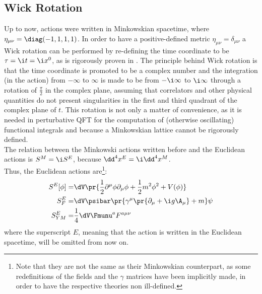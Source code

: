 \begin{comment}
\\Everything that has been said for $\SUN$ can be also extended to $\mathit{SO}(N)$ by replacing \emph{unitary} with \emph{orthogonal} and \emph{traceless} with \emph{antisymmetric}. In fact, this discussion can be made for every compact\footnote{Compactness, \ie $\Tr{T^aT^b}$ positive defined, is required in order to have a bounded from below Hamiltonian.} group, such as the symplectic group $\mathit{Sp}(2N)$ and the five exceptional Lie groups $\mathit{G}(2)$, $\spF$, $\mathit{E}(6)$, $\mathit{E}(7)$ and $\mathit{E}(8)$.
\end{comment}

\subsection{Wick Rotation}
Up to now, actions were written in Minkowskian spacetime, where $\eta_{\mu\nu} = \diag(-1,1,1,1)$. In order to have a positive-defined metric $\eta_{\mu\nu} = \delta_{\mu\nu}$ a Wick rotation can be performed by re-defining the time coordinate to be $\tau = \i t = \i x^0$, as is rigorously proven in \cite{SCHLINGEMANN_1999}.
The principle behind Wick rotation is that the time coordinate is promoted to be a complex number and the integration (in the action) from $-\infty$ to $\infty$ is made to be from $-\i\infty$ to $\i\infty$ through a rotation of $\frac\pi2$ in the complex plane, assuming that correlators and other physical quantities do not present singularities in the first and third quadrant of the complex plane of $t$.
This rotation is not only a matter of convenience, as it is needed in perturbative QFT for the computation of (otherwise oscillating) functional integrals and because a Minkowskian lattice cannot be rigorously defined.\\
The relation between the Minkowski actions written before and the Euclidean actions is $S^M = \i S^E$, because $\dd^4x^E = \i \dd^4x^M$.\\
Thus, the Euclidean actions are\footnote{Note that they are not the same as their Minkowskian counterpart, as some redefinitions of the fields and the $\gamma$ matrices have been implicitly made, in order to have the respective theories non ill-defined.}:
\begin{align}
    S^E[\phi] =& \dV \pr{\frac12\partial^\mu\phi\partial_\mu\phi+\frac12m^2\phi^2+V(\phi)} \label{1:ScalarActionEuclidean}\\
    S^E_F =& \dV\psibar\pr{\gamma^\mu\pr{\partial_\mu+\i g \A_\mu} + m}\psi \label{1:FerionActionEuclidean}\\
    S^E_{YM} =& \frac14 \dV \Fmunu^a F^{a\mu\nu} \label{1:YMActionEuclidean}
\end{align}
where the superscript $E$, meaning that the action is written in the Euclidean spacetime, will be omitted from now on.

